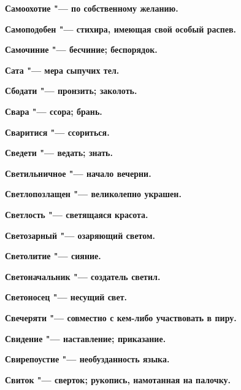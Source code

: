 \begin{multicols}{2}
\bfseries Самоохотие\normalfont{} "--- по собственному желанию. 




\bfseries Самоподобен\normalfont{} "--- стихира, имеющая свой особый распев. 




\bfseries Самочиние\normalfont{} "--- бесчиние; беспорядок. 




\bfseries Сата\normalfont{} "--- мера сыпучих тел. 




\bfseries Сбодати\normalfont{} "--- пронзить; заколоть. 




\bfseries Свара\normalfont{} "--- ссора; брань. 




\bfseries Сваритися\normalfont{} "--- ссориться. 




\bfseries Сведети\normalfont{} "--- ведать; знать. 




\bfseries Светильничное\normalfont{} "--- начало вечерни. 




\bfseries Светлопозлащен\normalfont{} "--- великолепно украшен. 




\bfseries Светлость\normalfont{} "--- светящаяся красота. 




\bfseries Светозарный\normalfont{} "--- озаряющий светом. 




\bfseries Светолитие\normalfont{} "--- сияние. 




\bfseries Светоначальник\normalfont{} "--- создатель светил. 




\bfseries Светоносец\normalfont{} "--- несущий свет. 




\bfseries Свечеряти\normalfont{} "--- совместно с кем-либо участвовать в пиру. 




\bfseries Свидение\normalfont{} "--- наставление; приказание. 




\bfseries Свирепоустие\normalfont{} "--- необузданность языка. 




\bfseries Свиток\normalfont{} "--- сверток; рукопись, намотанная на палочку. 





\end{multicols}
